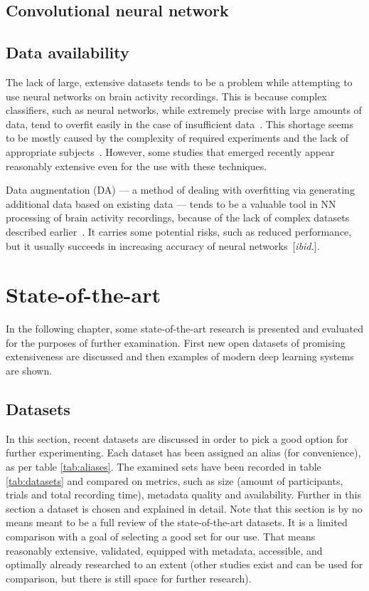 \documentclass[english, he, bc, kiv, iso690alph]{fasthesis}
\begin{document}
\section{Convolutional neural network}

\section{Data availability}

The lack of large, extensive datasets tends to be a problem while attempting to use neural networks on brain activity recordings. This is because complex classifiers, such as neural networks, while extremely precise with large amounts of data, tend to overfit easily in the case of insufficient data~\cite{domingos:ml:12}. This shortage seems to be mostly caused by the complexity of required experiments and the lack of appropriate subjects~\cite{he:da:21}. However, some studies that emerged recently appear reasonably extensive even for the use with these techniques.

Data augmentation (DA) --- a method of dealing with overfitting via generating additional data based on existing data --- tends to be a valuable tool in NN processing of brain activity recordings, because of the lack of complex datasets described earlier~\cite{he:da:21}. It carries some potential risks, such as reduced performance, but it usually succeeds in increasing accuracy of neural networks~[\emph{ibid.}].


\chapter{State-of-the-art}

In the following chapter, some state-of-the-art research is presented and evaluated for the purposes of further examination. First new open datasets of promising extensiveness are discussed and then examples of modern deep learning systems are shown.

\section{Datasets}

In this section, recent datasets are discussed in order to pick a good option for further experimenting. Each dataset has been assigned an alias (for convenience), as per table \ref{tab:aliases}. The examined sets have been recorded in table \ref{tab:datasets} and compared on metrics, such as size (amount of participants, trials and total recording time), metadata quality and availability. Further in this section a dataset is chosen and explained in detail. Note that this section is by no means meant to be a full review of the state-of-the-art datasets. It is a limited comparison with a goal of selecting a good set for our use. That means reasonably extensive, validated, equipped with metadata, accessible, and optimally already researched to an extent (other studies exist and can be used for comparison, but there is still space for further research).
\end{document}
